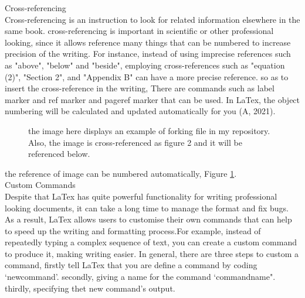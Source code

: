 \documentclass[a4paper, 11pt]{report}
\begin{document}
\noindent Cross-referencing\\
\noindent Cross-referencing is an instruction to look for related information elsewhere in the same book. cross-referencing is important in scientific or other professional looking, since it allows reference many things that can be numbered to increase precision of the writing. For instance, instead of using imprecise references such as "above", "below" and "beside", employing cross-references such as "equation (2)", "Section 2", and "Appendix B" can have a more precise reference. so as to insert the cross-reference in the writing, There are commands such as label marker and ref marker and pageref marker that can be used. In LaTex, the object numbering will be calculated and updated automatically for you (A, 2021). \\

\begin{figure}[h]

\centering

\graphicspath{ {./group-work} }

\caption{the image here displays an example of forking file in my repository.  Also, the image is cross-referenced as figure 2 and  it will be referenced below. }

\label{fig:leaf}

\end{figure}

\noindent the reference of image can be numbered automatically,  Figure \ref{fig:leaf}.\\

\noindent Custom Commands\\
\noindent Despite that LaTex has quite powerful functionality for writing professional looking documents, it can take a long time to manage the format and fix bugs. As a result, LaTex allows users to customise their own commands that can help to  speed up the writing and formatting process.For example, instead of repeatedly typing a complex sequence of text, you can create a custom command to produce it, making writing easier. In general, there are three steps to custom a command, firstly tell LaTex that you are define a command by coding ‘newcommand’.  secondly, giving a name for the command ‘commandname". thirdly, specifying thet new command’s output.\\

\newcommand{\todo}[1] {\textbf{\textcolor{red}{#1}}}
\end{document}
